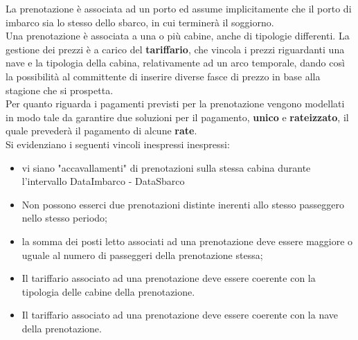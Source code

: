 \documentclass[a4paper, titlepage]{report}
\begin{document}
	\noindent
	La prenotazione è associata ad un porto ed assume implicitamente che il porto di imbarco sia lo stesso dello sbarco, in cui terminerà il soggiorno. \\
	
	\noindent
	Una prenotazione è associata a una o più cabine, anche di tipologie differenti. La gestione dei prezzi è a carico del \textbf{tariffario}, che vincola i prezzi riguardanti una nave e la tipologia della cabina, relativamente ad un arco temporale, dando così la possibilità al committente di inserire diverse fasce di prezzo in base alla stagione che si prospetta. \\
	\noindent
	Per quanto riguarda i pagamenti previsti per la prenotazione vengono modellati in modo tale da garantire due soluzioni per il pagamento, \textbf{unico} e \textbf{rateizzato}, il quale prevederà il pagamento di alcune \textbf{rate}.\\

	\noindent
	Si evidenziano i seguenti vincoli inespressi inespressi:
	\begin{itemize}
		\item vi siano "accavallamenti" di prenotazioni sulla stessa cabina durante l'intervallo DataImbarco - DataSbarco
		\item Non possono esserci due prenotazioni distinte inerenti allo stesso passeggero nello stesso periodo;
		\item la somma dei posti letto associati ad una prenotazione deve essere maggiore o uguale al numero di passeggeri della prenotazione stessa;
	    \item Il tariffario associato ad una prenotazione deve essere coerente con la tipologia delle cabine della prenotazione.
        \item Il tariffario associato ad una prenotazione deve essere coerente con la nave della prenotazione.
	\end{itemize}
	
\end{document}
